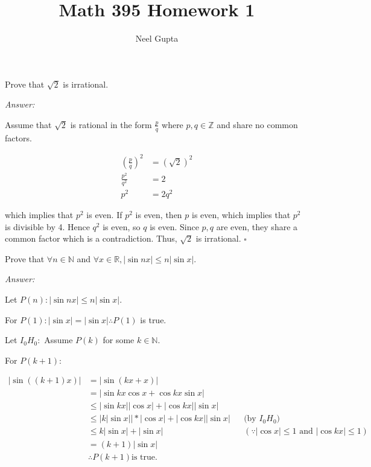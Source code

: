 \documentclass[12pt]{article}
\newenvironment{problem}[2][Problem]{\begin{trivlist}
\item[\hskip \labelsep {\bfseries #1}\hskip \labelsep {\bfseries #2.}]}{\end{trivlist}}
\begin{document}

\title{\vspace{-4cm}Math 395 Homework 1}
\author{Neel Gupta}
\maketitle

\begin{problem}{1}
Prove that $\sqrt{2}$ is irrational. 
\end{problem}


\textit{Answer:}

Assume that $\sqrt{2}$ is rational in the form $\frac{p}{q}$ where $p,q \in \mathbb{Z}$ and share no common factors.

\begin{align*}
	(\frac{p}{q})^2 &= (\sqrt{2})^2 \\
	\frac{p^2}{q^2} &= 2 \\
	p^2 &= 2q^2
\end{align*}

which implies that $p^2$ is even. If $p^2$ is even, then $p$ is even, which implies that $p^2$ is divisible by 4. Hence $q^2$ is even, so $q$ is even. Since $p, q$ are even, they share a common factor which is a contradiction. Thus, $\sqrt{2}$ is irrational.
$\square$

\begin{problem}{7}
Prove that $\forall n \in \mathbb{N}$ and $\forall x \in \mathbb{R},|\sin nx| \leq n|\sin x|$.
\end{problem}

\textit{Answer:}

Let $P(n): |\sin nx| \leq n|\sin x|$.

For $P(1): |\sin x| = |\sin x| \therefore P(1)$ is true.

Let $I_0H_0:$ Assume $P(k)$ for some $k\in\mathbb{N}$.

For $P(k+1):$

\begin{align*}
|\sin((k+1)x)| &= |\sin(kx+x)| \\
&= |\sin kx \cos x + \cos kx \sin x| \\
&\leq |\sin kx||\cos x|+|\cos kx||\sin x| \\
&\leq |k|\sin x||*|\cos x| + |\cos kx| |\sin x| && \text{(by $I_0H_0$)} \\
&\leq k |\sin x| + |\sin x| && (\because |\cos x| \leq 1 \text{ and } |\cos kx| \leq 1) \\ 
&= (k+1)|\sin x| \\
&\therefore P(k+1) \text{is true.}
\end{align*}
\end{document}
